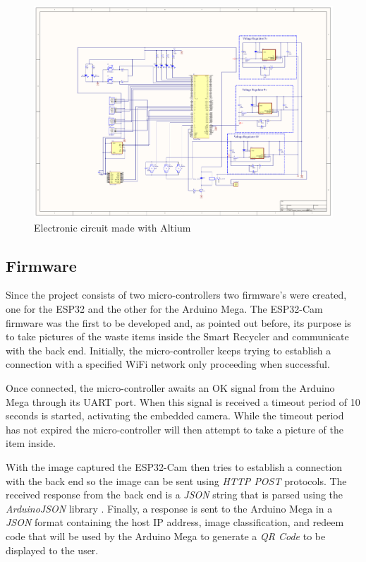 \documentclass[a4paper,11pt]{article}
\begin{document}
\begin{figure}[H]
  \centering
  \includegraphics[width=17.8cm, angle=-90]{Figures/Eletronical Circuit.pdf}
  \caption{\small{Electronic circuit made with Altium}}
  \label{fig:circuit}
\end{figure}

\subsection{Firmware}
Since the project consists of two micro-controllers two firmware's were created, one for the ESP32 and the other for the Arduino Mega. The ESP32-Cam firmware was the first to be developed and, as pointed out before, its purpose is to take pictures of the waste items inside the Smart Recycler and communicate with the back end. Initially, the micro-controller keeps trying to establish a connection with a specified WiFi network only proceeding when successful.

Once connected, the micro-controller awaits an OK signal from the Arduino Mega through its UART port. When this signal is received a timeout period of 10 seconds is started, activating the embedded camera. While the timeout period has not expired the micro-controller will then attempt to take a picture of the item inside.

With the image captured the ESP32-Cam then tries to establish a connection with the back end so the image can be sent using \textit{HTTP POST} protocols. The received response from the back end is a \textit{JSON} string that is parsed using the \textit{ArduinoJSON} library \cite{ArduinoJson}. Finally, a response is sent to the Arduino Mega in a \textit{JSON} format containing the host IP address, image classification, and redeem code that will be used by the Arduino Mega to generate a \textit{QR Code} to be displayed to the user.
\end{document}
